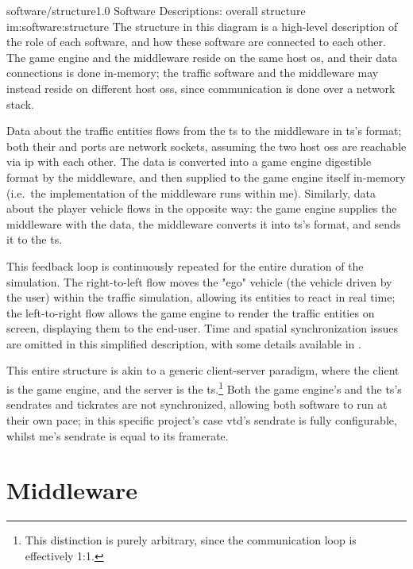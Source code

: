\begin{image}
	{software/structure}{1.0}
	{Software Descriptions: overall structure}
	{im:software:structure}
	{}
	{The structure in this diagram is a high-level description of the role of each software, and how these software are connected to each other. The game engine and the \gls{middleware} reside on the same host \gls{os}, and their data connections is done in-memory; the traffic software and the \gls{middleware} may instead reside on different host \glspl{os}, since communication is done over a network stack.}
\end{image}

Data about the traffic entities flows from the \gls{ts} to the \gls{middleware} in \gls{ts}'s format; both their  and  ports are network sockets, assuming the two host \glspl{os} are reachable via \gls{ip} with each other. The data is converted into a game engine digestible format by the \gls{middleware}, and then supplied to the game engine itself in-memory (i.e.\ the implementation of the \gls{middleware} runs within \gls{me}). Similarly, data about the player vehicle flows in the opposite way: the game engine supplies the \gls{middleware} with the data, the \gls{middleware} converts it into \gls{ts}'s format, and sends it to the \gls{ts}.

This feedback loop is continuously repeated for the entire duration of the simulation. The right-to-left flow moves the "ego" vehicle (the vehicle driven by the user) within the traffic simulation, allowing its entities to react in real time; the left-to-right flow allows the game engine to render the traffic entities on screen, displaying them to the end-user. Time and spatial synchronization issues are omitted in this simplified description, with some details available in .

This entire structure is akin to a generic client-server paradigm, where the client is the game engine, and the server is the \gls{ts}.\footnote{This distinction is purely arbitrary, since the communication loop is effectively \num{1}:\num{1}.} Both the game engine's and the \gls{ts}'s \glspl{sendrate} and \glspl{tickrate} are not synchronized, allowing both software to run at their own pace; in this specific project's case \gls{vtd}'s \gls{sendrate} is fully configurable, whilst \gls{me}'s \gls{sendrate} is equal to its framerate.

\section{Middleware}\label{sc:software:middleware}

